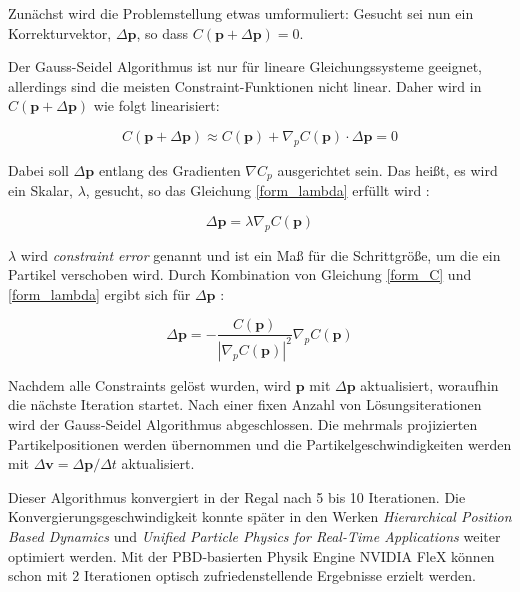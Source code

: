 Zunächst wird die Problemstellung etwas umformuliert: Gesucht sei nun ein \linebreak Korrekturvektor, $\Delta \textbf{p}$, so dass $C(\textbf{p}+\Delta \textbf{p})=0$. 

Der Gauss-Seidel Algorithmus ist nur für lineare Gleichungssysteme geeignet, allerdings sind die meisten Constraint-Funktionen nicht linear. Daher wird in \newline \cite{PBD} $C(\textbf{p}+\Delta \textbf{p})$ wie folgt linearisiert:

\begin{equation}
C(\textbf{p}+\Delta \textbf{p}) \approx C(\textbf{p}) + \nabla_p C(\textbf{p}) \cdot \Delta \textbf{p} = 0
\label{form_C}
\end{equation}

Dabei soll $\Delta \textbf{p}$ entlang des Gradienten $\nabla C_p$ ausgerichtet sein. Das heißt, es wird ein Skalar, $\lambda$, gesucht, so das Gleichung \ref{form_lambda} erfüllt wird \cite{PBD}:

\begin{equation}
\Delta \textbf{p} = \lambda \nabla_p C(\textbf{p})
\label{form_lambda}
\end{equation}

$\lambda$ wird \textit{constraint error} genannt und ist ein Maß für die Schrittgröße, um die ein Partikel verschoben wird. Durch Kombination von Gleichung \ref{form_C} und \ref{form_lambda} ergibt sich für $\Delta \textbf{p}$ \cite{PBD}:

\begin{equation}
\Delta \textbf{p} = - \frac{C(\textbf{p})}{|\nabla_p C(\textbf{p})|^2} \nabla_p C(\textbf{p}) 
\label{form_db}
\end{equation}

Nachdem alle Constraints gelöst wurden, wird $\textbf{p}$ mit $\Delta \textbf{p}$ aktualisiert, woraufhin die nächste Iteration startet. Nach einer fixen Anzahl von Lösungsiterationen wird der Gauss-Seidel Algorithmus abgeschlossen. Die mehrmals projizierten Partikelpositionen werden übernommen und die Partikelgeschwindigkeiten werden mit \linebreak  $\Delta \textbf{v} = \Delta \textbf{p} / \Delta t$ aktualisiert.

Dieser Algorithmus konvergiert in der Regal nach 5 bis 10 Iterationen. Die Konvergierungsgeschwindigkeit konnte später in den Werken \textit{Hierarchical Position Based Dynamics} \cite{Mller2008HierarchicalPB} und \textit{Unified Particle Physics for Real-Time Applications} \cite{UPP} weiter optimiert werden. Mit der PBD-basierten Physik  \linebreak Engine NVIDIA FleX können schon mit 2 Iterationen optisch zufriedenstellende Ergebnisse erzielt werden.

